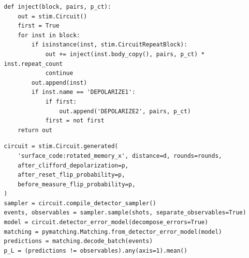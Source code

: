 \begin{lstlisting}[caption={Iniezione ricorsiva del crosstalk nel circuito del surface code.}, label={lst:crosstalk}]
def inject(block, pairs, p_ct):
    out = stim.Circuit()
    first = True
    for inst in block:
        if isinstance(inst, stim.CircuitRepeatBlock):
            out += inject(inst.body_copy(), pairs, p_ct) * inst.repeat_count
            continue
        out.append(inst)
        if inst.name == 'DEPOLARIZE1':
            if first:
                out.append('DEPOLARIZE2', pairs, p_ct)
            first = not first
    return out
\end{lstlisting}

\begin{lstlisting}[caption={Stima di $p_L$ con Stim e PyMatching.}, label={lst:stim_pymatching}]
circuit = stim.Circuit.generated(
    'surface_code:rotated_memory_x', distance=d, rounds=rounds,
    after_clifford_depolarization=p,
    after_reset_flip_probability=p,
    before_measure_flip_probability=p,
)
sampler = circuit.compile_detector_sampler()
events, observables = sampler.sample(shots, separate_observables=True)
model = circuit.detector_error_model(decompose_errors=True)
matching = pymatching.Matching.from_detector_error_model(model)
predictions = matching.decode_batch(events)
p_L = (predictions != observables).any(axis=1).mean()
\end{lstlisting}

